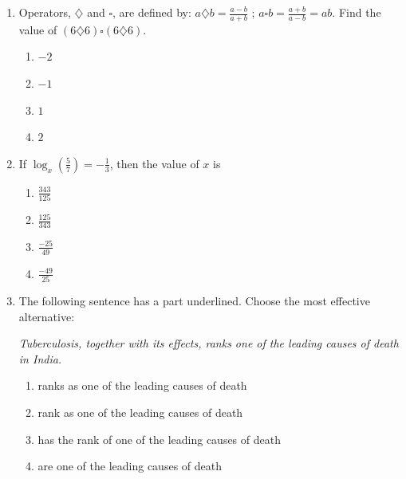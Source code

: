\documentclass[journal,12pt,onecolumn]{IEEEtran}
\begin{document}
\begin{enumerate}[label=\arabic*)]
\vspace{0.5cm}

\item Operators, $\diamondsuit$ and $\square$, are defined by:  
$a\diamondsuit b = \frac{a-b}{a+b}$ ; \quad $a\square b = \frac{a+b}{a-b} = ab$.  
Find the value of $(6\diamondsuit 6) \square (6\diamondsuit 6)$.
\vspace{0.2cm}
\hfill{} \\

\begin{enumerate}[label=\alph*)]
\item $-2$
\item $-1$
\item $1$
\item $2$
\end{enumerate}

\vspace{0.5cm}

\item If $\log_x \left(\frac{5}{7}\right) = -\frac{1}{3}$, then the value of $x$ is  

\vspace{0.2cm}
\begin{enumerate}[label=\alph*)]
\item $\frac{343}{125}$
\vspace{0.1cm}
\item $\frac{125}{343}$
\vspace{0.1cm}
\item $\frac{-25}{49}$
\vspace{0.1cm}
\item $\frac{-49}{25}$
\end{enumerate}

\vspace{0.5cm}

\item The following sentence has a part underlined. Choose the most effective alternative:  

\emph{Tuberculosis, together with its effects, ranks one of the leading causes of death in India.}  
\hfill{} \\

\vspace{0.2cm}
\begin{enumerate}[label=\alph*)]
\item ranks as one of the leading causes of death
\item rank as one of the leading causes of death
\item has the rank of one of the leading causes of death
\item are one of the leading causes of death
\end{enumerate}


\end{enumerate}
\end{document}
